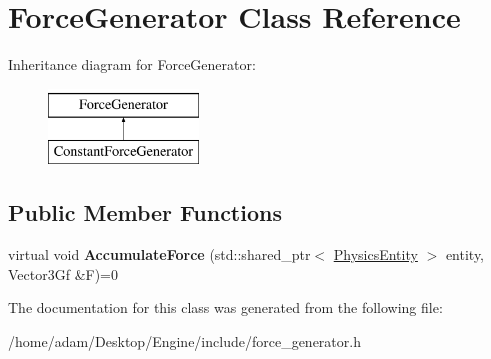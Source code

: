 \hypertarget{classForceGenerator}{}\section{Force\+Generator Class Reference}
\label{classForceGenerator}
Inheritance diagram for Force\+Generator\+:\begin{figure}[H]
\begin{center}
\leavevmode
\includegraphics[height=2.000000cm]{classForceGenerator}
\end{center}
\end{figure}
\subsection*{Public Member Functions}
\begin{DoxyCompactItemize}
\item 
\mbox{\label{classForceGenerator_a96cae0febb1fa8a0bb017aba7b82dbe8}} 
virtual void {\bfseries Accumulate\+Force} (std\+::shared\+\_\+ptr$<$ \hyperlink{classPhysicsEntity}{Physics\+Entity} $>$ entity, Vector3\+Gf \&F)=0
\end{DoxyCompactItemize}


The documentation for this class was generated from the following file\+:\begin{DoxyCompactItemize}
\item 
/home/adam/\+Desktop/\+Engine/include/force\+\_\+generator.\+h\end{DoxyCompactItemize}
